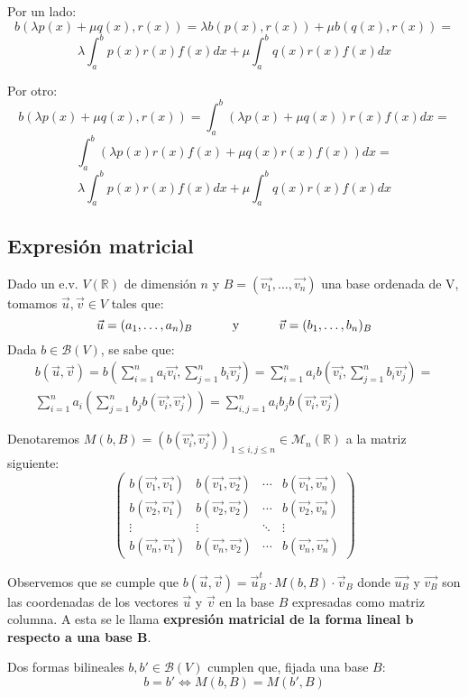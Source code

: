 \documentclass[x11names,table]{report}
\begin{document}
Por un lado:
\[
b(\lambda p(x)+\mu q(x),r(x))=\lambda b(p(x),r(x))+\mu b(q(x),r(x))=\]\[\lambda\int^b_a p(x)r(x)f(x)dx+\mu\int_a^b q(x)r(x)f(x)dx
\]

Por otro:
\[
b(\lambda p(x)+\mu q(x),r(x))=\int_a^b(\lambda p(x)+\mu q(x))r(x)f(x)dx=\]\[\int_a^b(\lambda p(x)r(x)f(x)+\mu q(x)r(x)f(x))dx=\]\[\lambda\int^b_a p(x)r(x)f(x)dx+\mu\int_a^b q(x)r(x)f(x)dx
\]

\subsection*{Expresión matricial}

Dado un e.v. $V(\mathbb{R})$ de dimensión $n$ y $B=(\vec{v_1},\dots,\vec{v_n})$ una base ordenada de V, tomamos $\vec{u},\vec{v}\in V$ tales que:
\[
\vec{u}=(a_1,\dots,a_n)_B \text{\hspace{1cm} y \hspace{1cm}} \vec{v}=(b_1,\dots,b_n)_B
\]
Dada $b\in\mathcal{B}(V)$, se sabe que:
\begin{align*}
b(\vec{u},\vec{v})=b\left(\sum^n_{i=1} a_i\vec{v_i},\sum^n_{j=1} b_i\vec{v_j}\right)=
\sum^n_{i=1} a_i b\left(\vec{v_i}, \sum^n_{j=1} b_i\vec{v_j}\right)= \\
\sum^n_{i=1}a_i\left(\sum^n_{j=1}b_j b(\vec{v_i},\vec{v_j})\right)=\sum^n_{i,j=1}a_i b_j b(\vec{v_i},\vec{v_j})
\end{align*}

Denotaremos $M(b,B)=(b(\vec{v_i},\vec{v_j}))_{1\leq i,j \leq n}\in \mathcal{M}_n(\mathbb{R})$ a la matriz siguiente:
\[
\begin{pmatrix}
b(\vec{v_1},\vec{v_1}) & b(\vec{v_1},\vec{v_2}) & \cdots & b(\vec{v_1},\vec{v_n})\\
b(\vec{v_2},\vec{v_1}) & b(\vec{v_2},\vec{v_2}) & \cdots & b(\vec{v_2},\vec{v_n})\\
\vdots & \vdots & \ddots & \vdots \\
b(\vec{v_n},\vec{v_1}) & b(\vec{v_n},\vec{v_2}) & \cdots & b(\vec{v_n},\vec{v_n})
\end{pmatrix}
\]




Observemos que se cumple que $b(\vec{u},\vec{v})=\vec{u}_B^t\cdot M(b,B)\cdot\vec{v}_B$ donde $\vec{u_B}$ y $\vec{v_B}$ son las coordenadas de los vectores $\vec{u}$ y $\vec{v}$ en la base $B$ expresadas como matriz columna. A esta se le llama \textbf{expresión matricial de la forma lineal $\mathbf{b}$ respecto a una base B}.

Dos formas bilineales $b,b'\in\mathcal{B}(V)$ cumplen que, fijada una base $B$:\[
b=b'\Longleftrightarrow M(b,B)=M(b',B)\]
\end{document}

